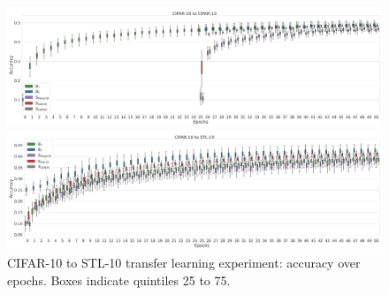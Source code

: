 
\begin{figure}[ht!]
\centering
\begin{minipage}[t]{0.42\textwidth}
\begin{center}
\includegraphics[angle=90,origin=c, trim=0in 0in 0in 0in, clip, width=1.00\linewidth]{figures/boxplots/CIFAR-10_to_CIFAR-10_boxplot.png}
\caption{CIFAR-10 in-dataset experiment: accuracy over epochs. 
Boxes indicate quintiles 25 to 75.}
\label{fig:sampling_boxplot_cifar_cifar}    
\end{center}
\end{minipage}
\hskip 2mm
\begin{minipage}[t]{0.42\textwidth}
\begin{center}
\includegraphics[angle=90,origin=c, trim=0in 0in 0in 0in, clip, width=1.00\linewidth]{figures/boxplots/CIFAR-10_to_STL-10_boxplot.png}
\caption{CIFAR-10 to STL-10 transfer learning experiment: accuracy over epochs. Boxes indicate quintiles 25 to 75.}
\label{fig:sampling_boxplot_cifar_stl}    
\end{center}
\end{minipage}

\end{figure}


